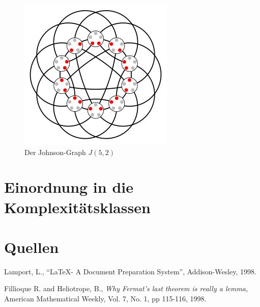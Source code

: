\documentclass[a4paper]{article}
\begin{document}
\begin{figure}
\centering
\includegraphics[scale=0.8]{j52.png}
\caption{Der Johnson-Graph $J(5,2)$}\label{fig:j52}
\end{figure}

\section{Einordnung in die Komplexitätsklassen}\label{sec:complexity}


\section{Quellen}

\begin{thebibliography}{9}
         {\sc Lamport, L.,}
         ``\LaTeX - A Document Preparation System'',
         Addison-Wesley, 1998.

         {\sc Fillioque R.} and {\sc Heliotrope, B.,}
         {\em Why Fermat's last theorem is really a lemma,}
         American Mathematical Weekly,
         Vol. 7, No. 1, pp 115-116, 1998.

\end{thebibliography}
\end{document}
